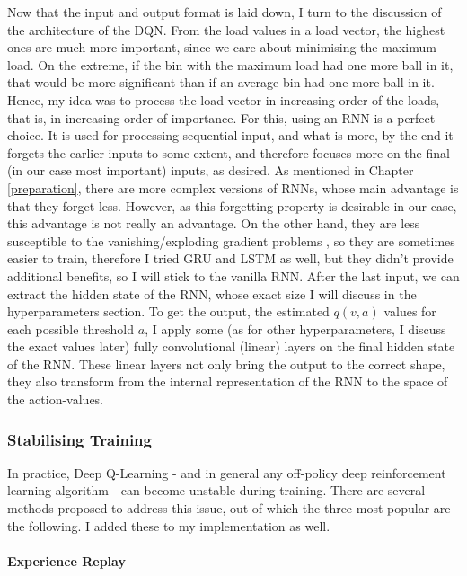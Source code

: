 Now that the input and output format is laid down, I turn to the discussion of the architecture of the DQN. From the load values in a load vector, the highest ones are much more important, since we care about minimising the maximum load. On the extreme, if the bin with the maximum load had one more ball in it, that would be more significant than if an average bin had one more ball in it. Hence, my idea was to process the load vector in increasing order of the loads, that is, in increasing order of importance. For this, using an RNN is a perfect choice. It is used for processing sequential input, and what is more, by the end it forgets the earlier inputs to some extent, and therefore focuses more on the final (in our case most important) inputs, as desired. As mentioned in Chapter \ref{preparation}, there are more complex versions of RNNs, whose main advantage is that they forget less. However, as this forgetting property is desirable in our case, this advantage is not really an advantage. On the other hand, they are less susceptible to the vanishing/exploding gradient problems \cite{noh2021rnnvanishinggradient}, so they are sometimes easier to train, therefore I tried GRU and LSTM as well, but they didn't provide additional benefits, so I will stick to the vanilla RNN. After the last input, we can extract the hidden state of the RNN, whose exact size I will discuss in the hyperparameters section. To get the output, the estimated $q(v,a)$ values for each possible threshold $a$, I apply some (as for other hyperparameters, I discuss the exact values later) fully convolutional (linear) layers on the final hidden state of the RNN. These linear layers not only bring the output to the correct shape, they also transform from the internal representation of the RNN to the space of the action-values. 


\subsubsection{Stabilising Training}


In practice, Deep Q-Learning - and in general any off-policy deep reinforcement learning algorithm - can become unstable during training. There are several methods proposed to address this issue, out of which the three most popular are the following. I added these to my implementation as well.


\paragraph{Experience Replay}


